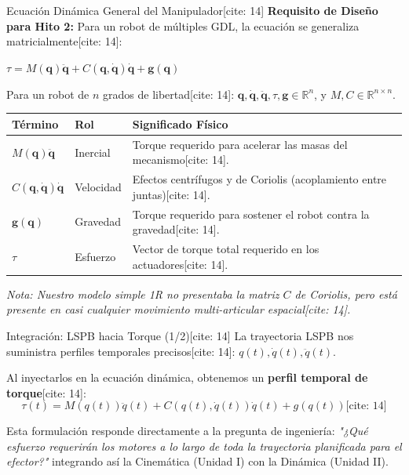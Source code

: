\documentclass[aspectratio=169, xcolor={table,xcdraw}]{beamer}
\begin{document}
\begin{frame}{Ecuación Dinámica General del Manipulador[cite: 14]}
    \textbf{Requisito de Diseño para Hito 2:} Para un robot de múltiples GDL, la ecuación se generaliza matricialmente[cite: 14]:
    \begin{center}
        $\displaystyle \boxed{ \tau = M(\mathbf{q})\ddot{\mathbf{q}} + C(\mathbf{q}, \dot{\mathbf{q}})\dot{\mathbf{q}} + \mathbf{g}(\mathbf{q}) }$ \text{[cite: 14]}
    \end{center}
    
    Para un robot de $n$ grados de libertad[cite: 14]: $\mathbf{q}, \dot{\mathbf{q}}, \ddot{\mathbf{q}}, \tau, \mathbf{g} \in \mathbb{R}^n$, y $M, C \in \mathbb{R}^{n \times n}$.
    
    \vspace{0.2cm}
    \begin{center}
        \renewcommand{\arraystretch}{1.3}
        \footnotesize
        \begin{tabular}{|l|l|p{6cm}|}
        \hline
        \rowcolor{gray!20}\textbf{Término} & \textbf{Rol} & \textbf{Significado Físico} \\ \hline
        $M(\mathbf{q})\ddot{\mathbf{q}}$ & Inercial & Torque requerido para acelerar las masas del mecanismo[cite: 14]. \\ \hline
        $C(\mathbf{q}, \dot{\mathbf{q}})\dot{\mathbf{q}}$ & Velocidad & Efectos centrífugos y de Coriolis (acoplamiento entre juntas)[cite: 14]. \\ \hline
        $\mathbf{g}(\mathbf{q})$ & Gravedad & Torque requerido para sostener el robot contra la gravedad[cite: 14]. \\ \hline
        $\tau$ & Esfuerzo & Vector de torque total requerido en los actuadores[cite: 14]. \\ \hline
        \end{tabular}
    \end{center}
    \tiny{\textit{Nota: Nuestro modelo simple 1R no presentaba la matriz $C$ de Coriolis, pero está presente en casi cualquier movimiento multi-articular espacial[cite: 14].}}
\end{frame}

\begin{frame}{Integración: LSPB hacia Torque (1/2)[cite: 14]}
    La trayectoria LSPB nos suministra perfiles temporales precisos[cite: 14]: $q(t), \dot{q}(t), \ddot{q}(t)$.
    
    \vspace{0.3cm}
    Al inyectarlos en la ecuación dinámica, obtenemos un \textbf{perfil temporal de torque}[cite: 14]:
    \begin{equation*}
        \boxed{\tau(t) = M(q(t))\ddot{q}(t) + C(q(t), \dot{q}(t))\dot{q}(t) + g(q(t))} \text{[cite: 14]}
    \end{equation*}

    \vfill
    Esta formulación responde directamente a la pregunta de ingeniería: \textit{"¿Qué esfuerzo requerirán los motores a lo largo de toda la trayectoria planificada para el efector?"} integrando así la Cinemática (Unidad I) con la Dinámica (Unidad II).
\end{frame}
\end{document}
